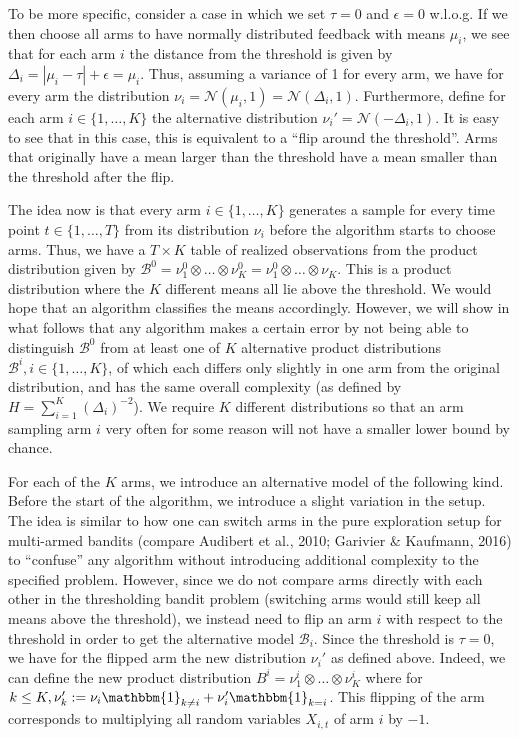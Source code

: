 \documentclass[12pt,]{article}
\begin{document}
To be more specific, consider a case in which we set \(\tau = 0\) and
\(\epsilon = 0\) w.l.o.g. If we then choose all arms to have normally
distributed feedback with means \(\mu_i\), we see that for each arm
\(i\) the distance from the threshold is given by
\(\Delta_i = |\mu_i - \tau| + \epsilon = \mu_i\). Thus, assuming a
variance of 1 for every arm, we have for every arm the distribution
\(\nu_i = \mathcal{N}(\mu_i,1) = \mathcal{N}(\Delta_i,1)\). Furthermore,
define for each arm \(i \in \{1, \dots, K\}\) the alternative
distribution \(\nu_i' = \mathcal{N}(-\Delta_i,1)\). It is easy to see
that in this case, this is equivalent to a ``flip around the
threshold''. Arms that originally have a mean larger than the threshold
have a mean smaller than the threshold after the flip.

The idea now is that every arm \(i \in \{1,\dots,K\}\) generates a
sample for every time point \(t\in \{1, \dots, T\}\) from its
distribution \(\nu_i\) before the algorithm starts to choose arms. Thus,
we have a \(T \times K\) table of realized observations from the product
distribution given by
\(\mathcal{B}^0 = \nu_1^0 \otimes \ldots \otimes \nu_K^0 = \nu_1^0 \otimes \ldots \otimes \nu_K\).
This is a product distribution where the \(K\) different means all lie
above the threshold. We would hope that an algorithm classifies the
means accordingly. However, we will show in what follows that any
algorithm makes a certain error by not being able to distinguish
\(\mathcal{B}^0\) from at least one of \(K\) alternative product
distributions \(\mathcal{B}^i, i \in \{1, \dots, K\}\), of which each
differs only slightly in one arm from the original distribution, and has
the same overall complexity (as defined by
\(H = \sum_{i=1}^K (\Delta_i)^{-2}\)). We require \(K\) different
distributions so that an arm sampling arm \(i\) very often for some
reason will not have a smaller lower bound by chance.

For each of the \(K\) arms, we introduce an alternative model of the
following kind. Before the start of the algorithm, we introduce a slight
variation in the setup. The idea is similar to how one can switch arms
in the pure exploration setup for multi-armed bandits (compare Audibert
et al., 2010; Garivier \& Kaufmann, 2016) to ``confuse'' any algorithm
without introducing additional complexity to the specified problem.
However, since we do not compare arms directly with each other in the
thresholding bandit problem (switching arms would still keep all means
above the threshold), we instead need to flip an arm \(i\) with respect
to the threshold in order to get the alternative model
\(\mathcal{B}_i\). Since the threshold is \(\tau = 0\), we have for the
flipped arm the new distribution \(\nu_i'\) as defined above. Indeed, we
can define the new product distribution
\(B^i = \nu_1^i \otimes \dots \otimes \nu_K^i\) where for
\(k \leq K, \nu_k' := \nu_i \mathbbm{1}_{k \neq i} + \nu_i' \mathbbm{1}_{k=i}\).
This flipping of the arm corresponds to multiplying all random variables
\(X_{i,t}\) of arm \(i\) by \(-1\).
\end{document}
